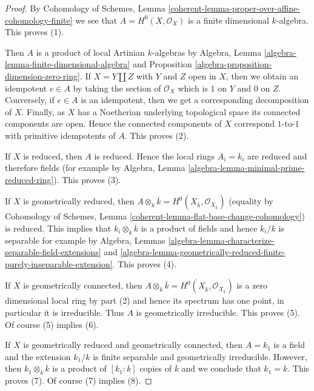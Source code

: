\documentclass[10pt,a4paper]{amsart}
\theoremstyle{plain}
\theoremstyle{definition}
\theoremstyle{remark}
\numberwithin{equation}{subsection}
\begin{document}
\begin{proof}
By Cohomology of Schemes, Lemma
\ref{coherent-lemma-proper-over-affine-cohomology-finite}
we see that $A = H^0(X, \mathcal{O}_X)$ is a finite dimensional
$k$-algebra. This proves (1).

\medskip\noindent
Then $A$ is a product of local Artinian $k$-algebras by
Algebra, Lemma \ref{algebra-lemma-finite-dimensional-algebra} and
Proposition \ref{algebra-proposition-dimension-zero-ring}.
If $X = Y \amalg Z$ with $Y$ and $Z$ open in $X$, then we obtain
an idempotent $e \in A$ by taking the section of $\mathcal{O}_X$
which is $1$ on $Y$ and $0$ on $Z$. Conversely, if $e \in A$
is an idempotent, then we get a corresponding decomposition of $X$.
Finally, as $X$ has a Noetherian underlying topological space
its connected components are open. Hence the connected components
of $X$ correspond $1$-to-$1$ with primitive idempotents of $A$.
This proves (2).

\medskip\noindent
If $X$ is reduced, then $A$ is reduced. Hence the local rings $A_i = k_i$
are reduced and therefore fields (for example by
Algebra, Lemma \ref{algebra-lemma-minimal-prime-reduced-ring}).
This proves (3).

\medskip\noindent
If $X$ is geometrically reduced, then
$A \otimes_k \overline{k} =
H^0(X_{\overline{k}}, \mathcal{O}_{X_{\overline{k}}})$
(equality by Cohomology of Schemes, Lemma
\ref{coherent-lemma-flat-base-change-cohomology}) is reduced.
This implies that $k_i \otimes_k \overline{k}$ is a product
of fields and hence $k_i/k$ is separable for example by
Algebra,
Lemmas \ref{algebra-lemma-characterize-separable-field-extensions} and
\ref{algebra-lemma-geometrically-reduced-finite-purely-inseparable-extension}.
This proves (4).

\medskip\noindent
If $X$ is geometrically connected, then $A \otimes_k \overline{k} =
H^0(X_{\overline{k}}, \mathcal{O}_{X_{\overline{k}}})$
is a zero dimensional local ring by part (2) and hence its
spectrum has one point, in particular it is irreducible.
Thus $A$ is geometrically irreducible. This proves (5).
Of course (5) implies (6).

\medskip\noindent
If $X$ is geometrically reduced and geometrically connected, then
$A = k_1$ is a field and the extension $k_1/k$ is finite separable and
geometrically irreducible. However, then $k_1 \otimes_k \overline{k}$
is a product of $[k_1 : k]$ copies of $\overline{k}$ and we conclude
that $k_1 = k$. This proves (7). Of course (7) implies (8).
\end{proof}
\end{document}
